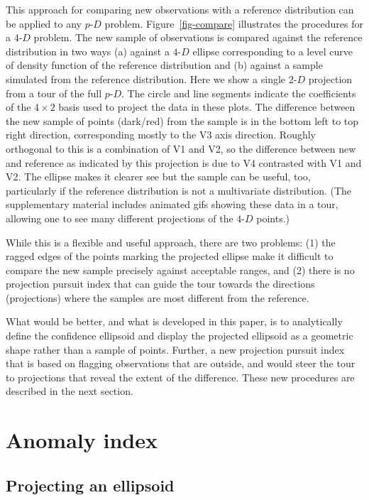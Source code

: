 \documentclass[
  12pt,
]{interact}
\newcommand\pD{$p\text{-}D$}
\newcommand\gD{$2\text{-}D$}
\newcommand\fD{$4\text{-}D$}
\begin{document}
This approach for comparing new observations with a reference
distribution can be applied to any \pD{} problem.
Figure~\ref{fig-compare} illustrates the procedures for a \fD{} problem.
The new sample of observations is compared against the reference
distribution in two ways (a) against a \fD{} ellipse corresponding to a
level curve of density function of the reference distribution and (b)
against a sample simulated from the reference distribution. Here we show
a single \gD{} projection from a tour of the full \pD{}. The circle and
line segments indicate the coefficients of the \(4\times 2\) basis used
to project the data in these plots. The difference between the new
sample of points (dark/red) from the sample is in the bottom left to top
right direction, corresponding mostly to the V3 axis direction. Roughly
orthogonal to this is a combination of V1 and V2, so the difference
between new and reference as indicated by this projection is due to V4
contrasted with V1 and V2. The ellipse makes it clearer see but the
sample can be useful, too, particularly if the reference distribution is
not a multivariate distribution. (The supplementary material includes
animated gifs showing these data in a tour, allowing one to see many
different projections of the \fD{} points.)

While this is a flexible and useful approach, there are two problems:
(1) the ragged edges of the points marking the projected ellipse make it
difficult to compare the new sample precisely against acceptable ranges,
and (2) there is no projection pursuit index that can guide the tour
towards the directions (projections) where the samples are most
different from the reference.

What would be better, and what is developed in this paper, is to
analytically define the confidence ellipsoid and display the projected
ellipsoid as a geometric shape rather than a sample of points. Further,
a new projection pursuit index that is based on flagging observations
that are outside, and would steer the tour to projections that reveal
the extent of the difference. These new procedures are described in the
next section.

\section{Anomaly index}\label{sec-anomaly-index}

\subsection{Projecting an ellipsoid}\label{projecting-an-ellipsoid}
\end{document}
